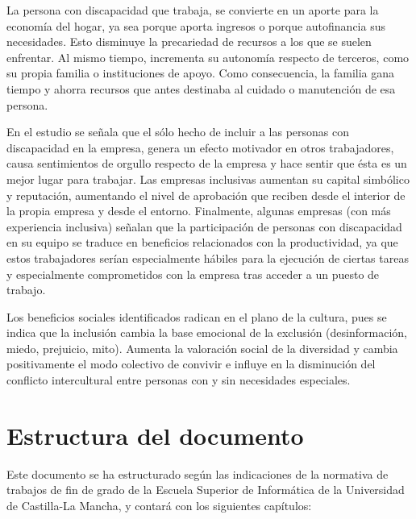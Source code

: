 La persona con discapacidad que trabaja, se convierte en un aporte para la economía del hogar, ya sea porque aporta ingresos o porque autofinancia sus necesidades. Esto disminuye la precariedad de recursos a los que se suelen enfrentar. Al mismo tiempo, incrementa su autonomía respecto de terceros, como su propia familia o instituciones de apoyo. Como consecuencia, la familia gana tiempo y ahorra recursos que antes destinaba al cuidado o manutención de esa persona. 

En el estudio se señala que el sólo hecho de incluir a las personas con discapacidad en la empresa, genera un efecto motivador en otros trabajadores, causa sentimientos de orgullo respecto de la empresa y hace sentir que ésta es un mejor lugar para trabajar. Las empresas inclusivas aumentan su capital simbólico y reputación, aumentando el nivel de aprobación que reciben desde el interior de la propia empresa y desde el entorno. Finalmente, algunas empresas (con más experiencia inclusiva) señalan que la participación de personas con discapacidad en su equipo se traduce en beneficios relacionados con la productividad, ya que estos trabajadores serían especialmente hábiles para la ejecución de ciertas tareas y especialmente comprometidos con la empresa tras acceder a un puesto de trabajo. 

Los beneficios sociales identificados radican en el plano de la cultura, pues se indica que la inclusión cambia la base emocional de la exclusión (desinformación, miedo, prejuicio, mito). Aumenta la valoración social de la diversidad  y cambia positivamente el modo colectivo de convivir e influye en la disminución del conflicto intercultural entre personas con y sin necesidades especiales.
 
\section{Estructura del documento}

  Este documento se ha estructurado según las indicaciones de la normativa de trabajos de fin de grado de la Escuela Superior de Informática de la Universidad de Castilla-La Mancha, y contará con los siguientes capítulos:



